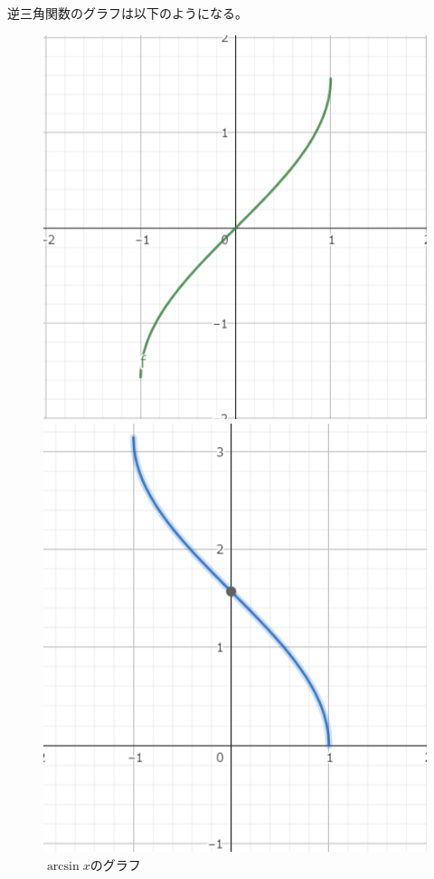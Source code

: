 \documentclass[a4j,dvipdfmx]{jsarticle}
\begin{document}
                逆三角関数のグラフは以下のようになる。
                \begin{figure}[h]
                    \begin{minipage}{5cm}
                        \centering
                        \includegraphics[keepaspectratio,scale=0.3]{img/QuuNote/ArcsinFuncGraph.png}
                        \caption{$\arcsin x$のグラフ}
                    \end{minipage}
                    \begin{minipage}{5cm}
                        \centering
                        \includegraphics[keepaspectratio,scale=0.3]{img/QuuNote/ArccosFuncGraph_ver2.png}

\end{minipage}
\end{figure}
\end{document}
